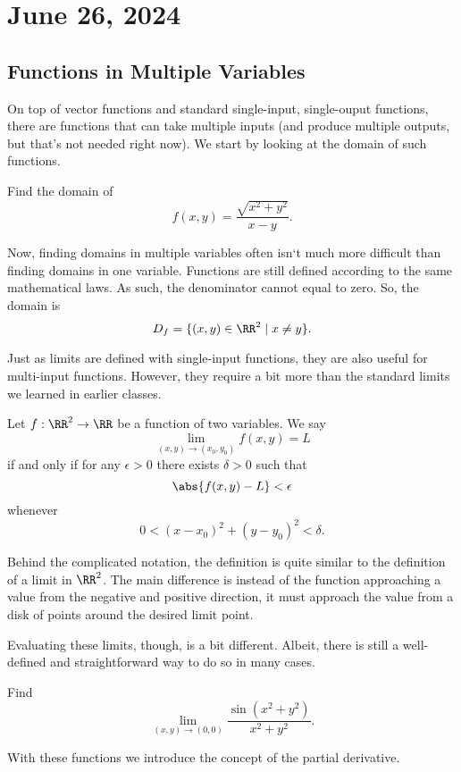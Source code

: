 \chapter{June 26, 2024}

\section{Functions in Multiple Variables}

On top of vector functions and standard single-input, single-ouput functions, there are functions that can take multiple inputs (and produce multiple outputs, but that's not needed right now). We start by looking at the domain of such functions.

\begin{example}
    Find the domain of
    \[f(x, y) = \frac{\sqrt{x^{2} + y^{2}}}{x - y}.\]

    \begin{soln}
        Now, finding domains in multiple variables often isn`t much more difficult than finding domains in one variable. Functions are still defined according to the same mathematical laws. As such, the denominator cannot equal to zero. So, the domain is
        \[D_{f} = \{(x, y) \in \RR^{2} \mid x \neq y\}.\]
    \end{soln}
\end{example}

Just as limits are defined with single-input functions, they are also useful for multi-input functions. However, they require a bit more than the standard limits we learned in earlier classes.

\begin{definition}
    Let $f : \RR^{2} \to \RR$ be a function of two variables. We say
    \[\lim_{(x, y) \to (x_{0}, y_{0})} f(x, y) = L\]
    if and only if for any $\epsilon > 0$ there exists $\delta > 0$ such that
    \[\abs{f(x, y) - L} < \epsilon\]
    whenever
    \[0 < (x - x_{0})^{2} + (y - y_{0})^{2} < \delta.\]
\end{definition}

Behind the complicated notation, the definition is quite similar to the definition of a limit in $\RR^{2}$. The main difference is instead of the function approaching a value from the negative and positive direction, it must approach the value from a disk of points around the desired limit point.

Evaluating these limits, though, is a bit different. Albeit, there is still a well-defined and straightforward way to do so in many cases.

\begin{example}
    Find
    \[\lim_{(x, y) \to (0, 0)} \frac{\sin\left(x^{2} + y^{2}\right)}{x^{2} + y^{2}}.\]

    \begin{soln}

    \end{soln}
\end{example}

With these functions we introduce the concept of the partial derivative.

